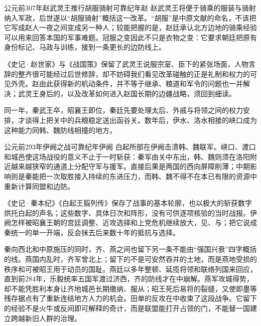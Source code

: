 \begin{event}{公元前307年}{赵武灵王推行胡服骑射}{可靠纪年}{赵}
赵武灵王将便于骑乘的服装与骑射纳入军政，后世遂以“胡服骑射”概括这一改革。“胡服”是中原文献的命名，不该把它写成赵人一夜之间变成另一种人；较能把握的是，赵廷承认北方边地的骑乘经验可以用来回答本国的军事难题。冠服之变因此不只是衣物之变：它要求朝廷把原有身份标记、马政与训练，接到一条更长的边防线上。

《史记·赵世家》与《战国策》保留了武灵王说服宗室、臣下的紧张场面，人物言辞的整齐很可能经过后世修辞，却不妨碍我们看见改革碰触的正是礼制和权力的可见外壳。赵由此获得新的机动条件，并不等于继承、粮道和军令的问题也一并解决；武灵王身后的，以及改革如何进入赵国长期的边疆战略，须回到细读。
\end{event}

同一年，秦武王卒，昭襄王即位，秦廷先要处理太后、外戚与将领之间的权力安排，才谈得上把关中的兵粮稳定送出函谷关。数年后，伊水、洛水相接的峡口成为这种能力同韩、魏防线相撞的地方。

\begin{event}{公元前293年}{伊阙之战}{可靠纪年}{伊阙}
白起所部在伊阙击溃韩、魏联军。峡口、渡口和城邑使这场战役的意义不止于一时斩获：秦军由关中东出，韩、魏则须在洛阳附近越来越狭窄的通道上分配守军与援军。直接后果是两国的西向屏障削薄；中期影响则是秦能把一次取胜接入持续的东进压力，而韩、魏不得不在本已有限的资源中重新计算同盟和边防。

《史记·秦本纪》《白起王翦列传》保存了战事的基本轮廓，也以极大的斩获数字烘托白起的声名；这些数字、具体日次和阵形，没有可供逐项核验的当时战报。伊阙怎样被昭襄王朝的宫廷调整、近攻选择和上党危机继续放大，见、与；把它说成秦统一的单一开端，反会抹去后来数十年的抵抗与选择。
\end{event}

秦向西北和中原施压的同时，齐、燕之间也留下另一条不能由“强国兴衰”四字概括的线。燕国内乱时，齐军曾北上；留下的不是可安然吞并的土地，而是燕地受损的秩序和可被昭王用于动员的国耻。燕廷以多年整顿、延揽将领和联络列国来回应，直到前284年，乐毅统率五国军渡过济西，齐的防线才在中崩解。燕军攻城得势，却不能凭胜利本身让齐地城邑长期缴纳、服从；昭王死后易将的裂缝，又使即墨等残存据点有了重新连结地方人力的机会。田单的反攻在中收束了这段战争。它留下的经验不是火牛或反间即可解释的奇计，而是联盟能打开占领的门，不能替一国建立跨越新旧人群的治理。

